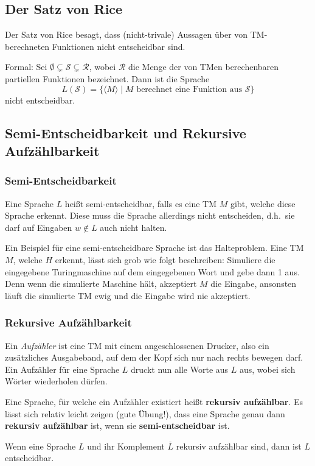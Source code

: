 \documentclass[a4paper,parskip=half*,DIV=7,fontsize=11pt]{scrartcl}
\newcommand\comp[1]{\overline#1}
\begin{document}
\subsection{Der Satz von Rice}
Der Satz von Rice besagt, dass (nicht-trivale) Aussagen über von TM-berechneten Funktionen nicht entscheidbar sind.

Formal: Sei $\emptyset \varsubsetneq \mathcal S \varsubsetneq \mathcal R$, wobei $\mathcal R$ die  Menge der von TMen berechenbaren partiellen Funktionen bezeichnet.  Dann ist die Sprache 
\[L(\mathcal S ) = \{\langle M \rangle \mid \text{$M$ berechnet eine Funktion aus $\mathcal S$}\}\]
nicht entscheidbar. 

\subsection{Semi-Entscheidbarkeit und Rekursive Aufzählbarkeit}
\subsubsection{Semi-Entscheidbarkeit}
Eine Sprache $L$ heißt semi-entscheidbar, falls es eine TM  $M$ gibt, welche diese Sprache erkennt. Diese muss die Sprache allerdings nicht entscheiden, d.h.\ sie darf auf Eingaben $w \notin L$ auch nicht halten.

Ein Beispiel für eine semi-entscheidbare Sprache ist das Halteproblem. Eine TM $M$, welche $H$ erkennt, lässt sich grob wie folgt beschreiben:  Simuliere die eingegebene Turingmaschine auf dem eingegebenen Wort und gebe dann 1 aus. Denn wenn die simulierte Maschine hält, akzeptiert $M$ die Eingabe, ansonsten läuft die simulierte TM ewig und die Eingabe wird nie akzeptiert.

\subsubsection{Rekursive Aufzählbarkeit}
Ein \emph{Aufzähler} ist eine TM mit einem angeschlossenen Drucker, also ein zusätzliches Ausgabeband, auf dem der Kopf sich nur nach rechts bewegen darf.  Ein Aufzähler für eine Sprache $L$ druckt nun alle Worte aus $L$ aus, wobei sich Wörter wiederholen dürfen.

Eine Sprache, für welche ein Aufzähler existiert heißt \textbf{rekursiv aufzählbar}. Es lässt sich relativ leicht zeigen (gute Übung!), dass eine Sprache genau dann \textbf{rekursiv aufzählbar} ist, wenn sie \textbf{semi-entscheidbar} ist.

Wenn eine Sprache $L$ und ihr Komplement $\comp{L}$ rekursiv aufzählbar sind, dann ist $L$ entscheidbar.
\end{document}
